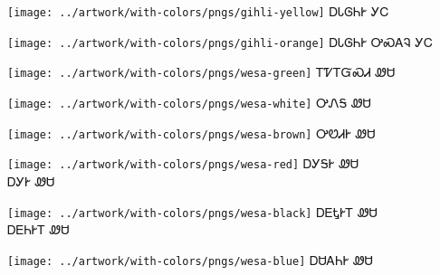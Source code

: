 \documentclass[avery5371]{flashcards}%
\begin{document}
    \begin{flashcard}{
        \texttt{[image: ../artwork/with-colors/pngs/gihli-yellow]}
    }
        \Huge ᎠᏓᎶᏂᎨ ᎩᏟ
    \end{flashcard}

    \begin{flashcard}{
        \texttt{[image: ../artwork/with-colors/pngs/gihli-orange]}
    }
        \Huge ᎠᏓᎶᏂᎨ ᎤᏍᎪᎸ ᎩᏟ
    \end{flashcard}

    \begin{flashcard}{
        \texttt{[image: ../artwork/with-colors/pngs/wesa-green]}
    }
        \Huge ᎢᏤᎢᏳᏍᏗ ᏪᏌ
    \end{flashcard}

    \begin{flashcard}{
        \texttt{[image: ../artwork/with-colors/pngs/wesa-white]}
    }
        \Huge ᎤᏁᎦ ᏪᏌ
    \end{flashcard}

    \begin{flashcard}{
        \texttt{[image: ../artwork/with-colors/pngs/wesa-brown]}
    }
        \Huge ᎤᏬᏗᎨ ᏪᏌ
    \end{flashcard}

    \begin{flashcard}{
        \texttt{[image: ../artwork/with-colors/pngs/wesa-red]}
    }
        \Huge ᎠᎩᎦᎨ ᏪᏌ\\ᎠᎩᎨ ᏪᏌ
    \end{flashcard}

    \begin{flashcard}{
        \texttt{[image: ../artwork/with-colors/pngs/wesa-black]}
    }
        \Huge ᎠᎬᎿᎨᎢ ᏪᏌ\\ᎠᎬᏂᎨᎢ ᏪᏌ
    \end{flashcard}

    \begin{flashcard}{
        \texttt{[image: ../artwork/with-colors/pngs/wesa-blue]}
    }
        \Huge ᎠᏌᎪᏂᎨ ᏪᏌ
    \end{flashcard}
\end{document}
